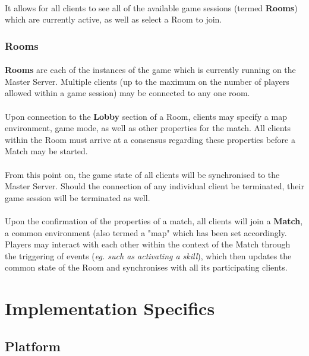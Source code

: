 \documentclass[12pt, titlepage]{article}
\begin{document}
\paragraph{}It allows for all clients to see all of the available game sessions (termed \textbf{Rooms}) which are currently active, as well as select a Room to join.
\subsubsection{Rooms}
\paragraph{}\textbf{Rooms} are each of the instances of the game which is currently running on the Master Server. Multiple clients (up to the maximum  on the number of players allowed within a game session) may be connected to any one room.
\paragraph{}Upon connection to the \textbf{Lobby} section of a Room, clients may specify a map environment, game mode, as well as other properties for the match. All clients within the Room must arrive at a consensus regarding these properties before a Match may be started.
\paragraph{}From this point on, the game state of all clients will be synchronised to the Master Server. Should the connection of any individual  client be terminated, their game session will be terminated as well.
\paragraph{}Upon the confirmation of the properties of a match, all clients will join a \textbf{Match}, a common environment (also termed a "map" which has been set accordingly. Players may interact with each other within the context of the Match through the triggering of events (\emph{eg. such as activating a skill}), which then updates the common state of the Room and synchronises with all its participating clients.

\section{Implementation Specifics}
\subsection{Platform}
\end{document}
